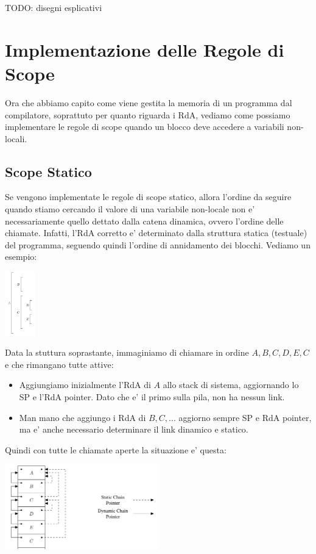 TODO: disegni esplicativi

\section{Implementazione delle Regole di Scope}

Ora che abbiamo capito come viene gestita la memoria di un programma dal compilatore, soprattuto per quanto riguarda i RdA, vediamo come possiamo implementare le regole di scope quando un blocco deve accedere a variabili non-locali.

\subsection{Scope Statico}

Se vengono implementate le regole di scope statico, allora l'ordine da seguire quando stiamo cercando il valore di una variabile non-locale non e' necessariamente quello dettato dalla catena dinamica, ovvero l'ordine delle chiamate. Infatti, l'RdA corretto e' determinato dalla struttura statica (testuale) del programma, seguendo quindi l'ordine di annidamento dei blocchi. Vediamo un esempio:

\begin{center}
  \includegraphics[width=0.1\textwidth]{img/2025-03-06-11-36-18.png}
\end{center}

Data la stuttura soprastante, immaginiamo di chiamare in ordine $ A,B,C,D,E,C $ e che rimangano tutte attive:
\begin{itemize}
\item Aggiungiamo inizialmente l'RdA di $ A $ allo stack di sistema, aggiornando lo SP e l'RdA pointer. Dato che e' il primo sulla pila, non ha nessun link.
\item Man mano che aggiungo i RdA di $ B,C,... $ aggiorno sempre SP e RdA pointer, ma e' anche necessario determinare il link dinamico e statico.
\end{itemize}

Quindi con tutte le chiamate aperte la situazione e' questa:
\begin{center}
  \includegraphics[width=0.5\textwidth]{img/2025-03-06-11-42-43.png}
\end{center}


